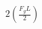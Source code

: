 \documentclass[preview]{standalone}
\begin{document}
\begin{align*}
2(\frac{F_gL}{2})
\end{align*}
\end{document}

